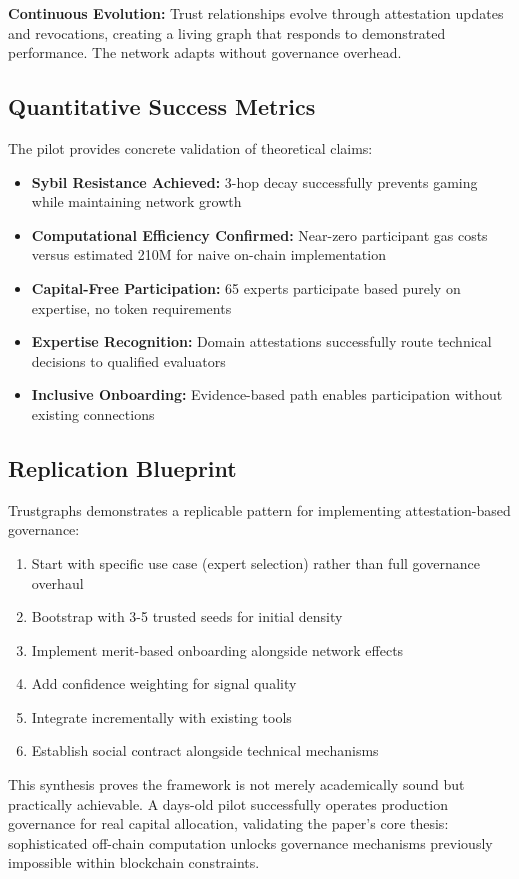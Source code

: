 \textbf{Continuous Evolution:} Trust relationships evolve through attestation updates and revocations, creating a living graph that responds to demonstrated performance. The network adapts without governance overhead.

\subsection{Quantitative Success Metrics}

The pilot provides concrete validation of theoretical claims:

\begin{itemize}
\item \textbf{Sybil Resistance Achieved:} 3-hop decay successfully prevents gaming while maintaining network growth
\item \textbf{Computational Efficiency Confirmed:} Near-zero participant gas costs versus estimated 210M for naive on-chain implementation
\item \textbf{Capital-Free Participation:} 65 experts participate based purely on expertise, no token requirements
\item \textbf{Expertise Recognition:} Domain attestations successfully route technical decisions to qualified evaluators
\item \textbf{Inclusive Onboarding:} Evidence-based path enables participation without existing connections
\end{itemize}

\subsection{Replication Blueprint}

Trustgraphs demonstrates a replicable pattern for implementing attestation-based governance:

\begin{enumerate}
\item Start with specific use case (expert selection) rather than full governance overhaul
\item Bootstrap with 3-5 trusted seeds for initial density
\item Implement merit-based onboarding alongside network effects
\item Add confidence weighting for signal quality
\item Integrate incrementally with existing tools
\item Establish social contract alongside technical mechanisms
\end{enumerate}

This synthesis proves the framework is not merely academically sound but practically achievable. A days-old pilot successfully operates production governance for real capital allocation, validating the paper's core thesis: sophisticated off-chain computation unlocks governance mechanisms previously impossible within blockchain constraints.
